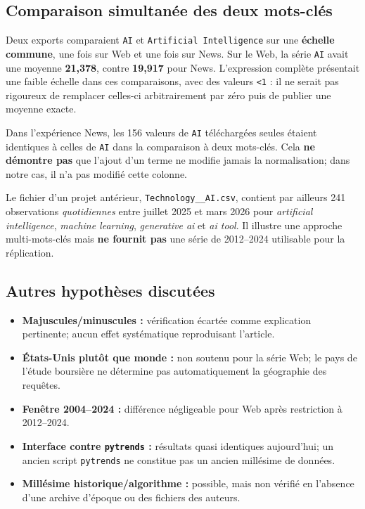 \documentclass[11pt,a4paper]{article}
\begin{document}
\subsection{Comparaison simultanée des deux mots-clés}
Deux exports comparaient \texttt{AI} et \texttt{Artificial Intelligence} sur une \textbf{échelle commune}, une fois sur Web et une fois sur News. Sur le Web, la série \texttt{AI} avait une moyenne \textbf{21,378}, contre \textbf{19,917} pour News. L'expression complète présentait une faible échelle dans ces comparaisons, avec des valeurs \texttt{<1} : il ne serait pas rigoureux de remplacer celles-ci arbitrairement par zéro puis de publier une moyenne exacte.

Dans l'expérience News, les 156 valeurs de \texttt{AI} téléchargées seules étaient identiques à celles de \texttt{AI} dans la comparaison à deux mots-clés. Cela \textbf{ne démontre pas} que l'ajout d'un terme ne modifie jamais la normalisation; dans notre cas, il n'a pas modifié cette colonne.

Le fichier d'un projet antérieur, \texttt{Technology\_\_AI.csv}, contient par ailleurs 241 observations \emph{quotidiennes} entre juillet 2025 et mars 2026 pour \emph{artificial intelligence}, \emph{machine learning}, \emph{generative ai} et \emph{ai tool}. Il illustre une approche multi-mots-clés mais \textbf{ne fournit pas} une série de 2012--2024 utilisable pour la réplication.

\subsection{Autres hypothèses discutées}
\begin{itemize}
\item \textbf{Majuscules/minuscules :} vérification écartée comme explication pertinente; aucun effet systématique reproduisant l'article.
\item \textbf{États-Unis plutôt que monde :} non soutenu pour la série Web; le pays de l'étude boursière ne détermine pas automatiquement la géographie des requêtes.
\item \textbf{Fenêtre 2004--2024 :} différence négligeable pour Web après restriction à 2012--2024.
\item \textbf{Interface contre \texttt{pytrends} :} résultats quasi identiques aujourd'hui; un ancien script \texttt{pytrends} ne constitue pas un ancien millésime de données.
\item \textbf{Millésime historique/algorithme :} possible, mais non vérifié en l'absence d'une archive d'époque ou des fichiers des auteurs.
\end{itemize}
\end{document}
